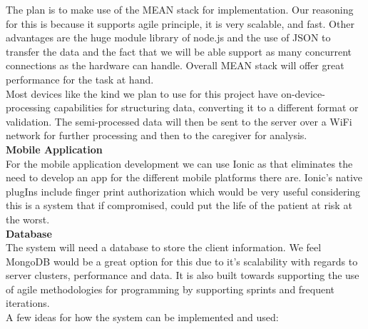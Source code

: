 \documentclass[12pt]{article}
\begin{document}
The plan is to make use of the MEAN stack for implementation. Our reasoning for this is because it supports agile principle, it is very scalable, and fast. Other advantages are the huge module library of node.js and the use of JSON to transfer the data and the fact that we will be able support as many concurrent connections as the hardware can handle. Overall MEAN stack will offer great performance for the task at hand.\\
	
	Most devices like the kind we plan to use for this project have on-device-processing capabilities for structuring data, converting it to a different format or validation. The semi-processed data will then be sent to the server over a WiFi network for further processing and then to the caregiver for analysis.	\\
	
	\textbf{Mobile Application}\\
	For the mobile application development we can use Ionic as that eliminates the need to develop an app for the different mobile platforms there are. Ionic's native plugIns include finger print authorization which would be very useful considering this is a system that if compromised, could put the life of the patient at risk at the worst. \\
	\newpage
	\textbf{Database}\\
	The system will need a database to store the client information. We feel MongoDB would be a great option for this due to it's scalability with regards to server clusters, performance and data. It is also built towards supporting the use of agile methodologies for programming by supporting sprints and frequent iterations.\\	
	
	A few ideas for how the system can be implemented and used:
	
\end{document}
